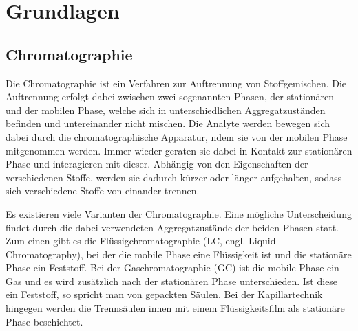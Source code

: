 
\chapter{Grundlagen}
\label{chapter:gru}

\section{Chromatographie}

Die Chromatographie ist ein Verfahren zur Auftrennung von Stoffgemischen. 
Die Auftrennung erfolgt dabei zwischen zwei sogenannten Phasen, der stationären und der mobilen Phase, welche sich in unterschiedlichen Aggregatzuständen befinden und untereinander nicht mischen. Die Analyte werden bewegen sich dabei durch die chromatographische Apparatur, ndem sie von der mobilen Phase mitgenommen werden. Immer wieder geraten sie dabei in Kontakt zur stationären Phase und interagieren mit dieser. Abhängig von den Eigenschaften der verschiedenen Stoffe, werden sie dadurch kürzer oder länger aufgehalten, sodass sich verschiedene Stoffe von einander trennen.

Es existieren viele Varianten der Chromatographie. Eine mögliche Unterscheidung findet durch die dabei verwendeten Aggregatzustände der beiden Phasen statt. Zum einen gibt es die Flüssigchromatographie (LC, engl. Liquid Chromatography),
bei der die mobile Phase eine Flüssigkeit ist und die stationäre Phase ein Feststoff. 
Bei der Gaschromatographie (GC) ist die mobile Phase ein Gas und es wird zusätzlich nach der stationären Phase unterschieden. Ist diese ein Feststoff, so spricht man von gepackten Säulen. Bei der Kapillartechnik hingegen werden die Trennsäulen innen mit einem Flüssigkeitsfilm als stationäre Phase beschichtet.



